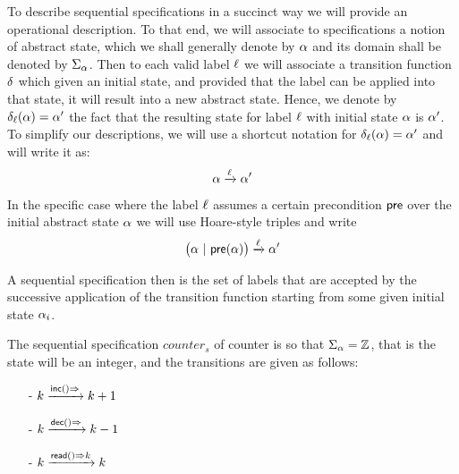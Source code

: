 To describe sequential specifications in a succinct way we will
provide an operational description.
To that end, we will associate to specifications a notion of abstract
state, which we shall generally denote by $\abstate$ and its domain
shall be denoted by $\abstates$.
Then to each valid label $\alabel$ we will associate a transition
function $\absopsemplain$ which given an initial state, and provided
that the label can be applied into that state, it will result into a
new abstract state.
Hence, we denote by $\absopsem{\abstate} = \abstate'$ the fact that
the resulting state for label $\alabel$ with initial state $\abstate$
is $\abstate'$.
%
To simplify our descriptions, we will use a shortcut notation for
$\absopsem{\abstate} = \abstate'$ and will write it as:
\[ \abstate \xrightarrow{\alabel}  \abstate' \]

In the specific case where the label $\alabel$ assumes a certain
precondition $\apre$ over the initial abstract state $\abstate$ we
will use Hoare-style triples and write
\[ \big(\abstate\ |\ \apre(\abstate)\big) \xrightarrow{\alabel}  \abstate' \]

A sequential specification then is the set of labels that are accepted
by the successive application of the transition function starting from
some given initial state $\abstate_{i}$.

\begin{example}
\label{definition:sequential specification of counter}
The sequential specification $\mathit{counter}_s$ of counter is so
that $\abstates = \mathbb{Z}$, that is the state will be an integer,
and the transitions are given as follows:
\begin{itemize}
\setlength{\itemsep}{0.5pt}
\item[-] $k \xrightarrow{\alabellong[\mathsf{inc}]{}{}} k+1$
\item[-] $k \xrightarrow{\alabellong[\mathsf{dec}]{}{}} k-1$
\item[-] $k \xrightarrow{\alabellong[\mathsf{read}]{}{k}} k$
\end{itemize}
\end{example}


